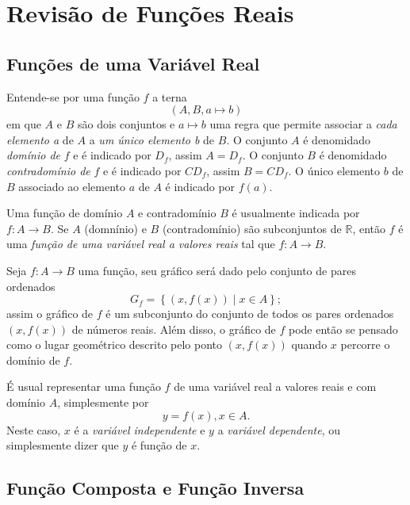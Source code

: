 \chapter{Revisão de Funções Reais}
\label{chap:revisão_de_funções_reais}

	 \section{Funções de uma Variável Real}
	 \label{sec:funções_de_uma_variável_real}
	 
	 Entende-se por uma função $f$ a terna
	 \begin{equation}
		 (A,B,a \mapsto b)
	 \end{equation}
	 em que $A$ e $B$ são dois conjuntos e $a \mapsto b$ uma regra que permite associar a \textit{cada elemento a} de $A$ a \textit{um único elemento b} de $B$. O conjunto $A$ é denomidado \textit{domínio de} $f$ e é indicado por $D_f$, assim $A=D_f$. O conjunto $B$ é denomidado \textit{contradomínio de} $f$ e é indicado por $CD_f$, assim $B=CD_f$. O único elemento $b$ de $B$ associado ao elemento $a$ de $A$ é indicado por $f(a)$.

	 Uma função de domínio $A$ e contradomínio $B$ é usualmente indicada por $f:A\rightarrow B$. Se $A$ (domnínio) e $B$ (contradomínio) são subconjuntos de $\mathbb{R}$, então $f$ é uma \textit{função de uma variável real a valores reais} tal que $f:A\rightarrow B$.

	 Seja $f:A\rightarrow B$ uma função, seu gráfico será dado pelo conjunto de pares ordenados
	 \begin{equation}
	 G_f = \left\{ \left(x,f\left(x\right)\right) \mid x \in A \right\};
	 \end{equation}
	 assim o gráfico de $f$ é um subconjunto do conjunto de todos os pares ordenados $\left(x,f(x)\right)$ de números reais. Além disso, o gráfico de $f$ pode então se pensado como o lugar geométrico descrito pelo ponto $\left(x,f(x)\right)$ quando $x$ percorre o domínio de $f$.

	 É usual representar uma função $f$ de uma variável real a valores reais e com domínio $A$, simplesmente por \[
	 	y=f(x),x \in A
	 .\] Neste caso, $x$ é a \textit{variável independente} e $y$ a \textit{variável dependente}, ou simplesmente dizer que $y$ é função de $x$.
	 

	\section{Função Composta e Função Inversa}
	\label{sec:função_composta_e_função_inversa}
	
